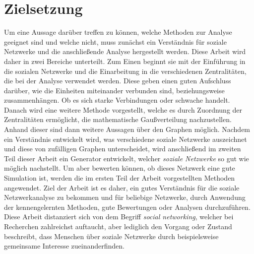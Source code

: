 \section{Zielsetzung}\label{sec:zielsetzung}
Um eine Aussage darüber treffen zu können, welche Methoden zur Analyse geeignet sind und welche nicht, muss zunächst ein Verständnis für soziale Netzwerke und die anschließende Analyse hergestellt werden. Diese Arbeit wird daher in zwei Bereiche unterteilt. Zum Einen beginnt sie mit der Einführung in die sozialen Netzwerke und die Einarbeitung in die verschiedenen Zentralitäten, die bei der Analyse verwendet werden. Diese geben einen guten Aufschluss darüber, wie die Einheiten miteinander verbunden sind, beziehungsweise zusammenhängen. Ob es sich starke Verbindungen oder schwache handelt. Danach wird eine weitere Methode vorgestellt, welche es durch Zuordnung der Zentralitäten ermöglicht, die mathematische Gaußverteilung nachzustellen. Anhand dieser sind dann weitere Aussagen über den Graphen möglich. Nachdem ein Verständnis entwickelt wird, was verschiedene soziale Netzwerke auszeichnet und diese von zufälligen Graphen unterscheidet, wird anschließend im zweiten Teil dieser Arbeit ein Generator entwickelt, welcher \textit{soziale Netzwerke} so gut wie möglich nachstellt. Um aber bewerten können, ob dieses Netzwerk eine gute Simulation ist, werden die im ersten Teil der Arbeit vorgestellten Methoden angewendet. Ziel der Arbeit ist es daher, ein gutes Verständnis für die soziale Netzwerkanalyse zu bekommen und für beliebige Netzwerke, durch Anwendung der kennengelernten Methoden, gute Bewertungen oder Analysen durchzuführen.
Diese Arbeit distanziert sich von dem Begriff \textit{social networking}, welcher bei Recherchen zahlreichst auftaucht, aber lediglich den Vorgang oder Zustand beschreibt, dass Menschen über soziale Netzwerke durch beispielsweise gemeinsame Interesse zueinanderfinden. 




